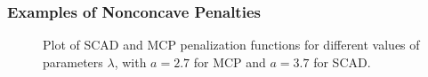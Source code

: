 \documentclass{beamer}
\begin{document}
\begin{frame}
  \frametitle{Examples of Nonconcave Penalties}
  \begin{figure}[h]
    \centering
    \centering
    \caption{Plot of SCAD and MCP penalization functions for different values of parameters $\lambda$, with $a = 2.7$ for MCP and $a = 3.7$ for SCAD.}\label{scad_mcp}
  \end{figure}
\end{frame}
\end{document}
